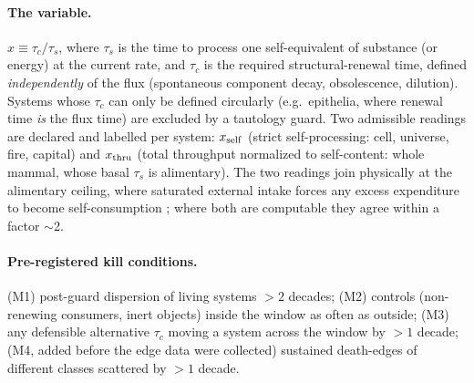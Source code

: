 \documentclass[11pt]{article}
\begin{document}
\paragraph{The variable.} $x \equiv \tau_c/\tau_s$, where $\tau_s$ is the time to process one
self-equivalent of substance (or energy) at the current rate, and $\tau_c$ is the required
structural-renewal time, defined \emph{independently} of the flux (spontaneous component decay,
obsolescence, dilution). Systems whose $\tau_c$ can only be defined circularly (e.g.\ epithelia,
where renewal time \emph{is} the flux time) are excluded by a tautology guard. Two admissible
readings are declared and labelled per system: $x_{\rm self}$ (strict self-processing: cell,
universe, fire, capital) and $x_{\rm thru}$ (total throughput normalized to self-content: whole
mammal, whose basal $\tau_s$ is alimentary). The two readings join physically at the alimentary
ceiling, where saturated external intake forces any excess expenditure to become
self-consumption \cite{Thurber2019}; where both are computable they agree within a factor $\sim$2.

\paragraph{Pre-registered kill conditions.} (M1) post-guard dispersion of living systems
$>2$ decades; (M2) controls (non-renewing consumers, inert objects) inside the window as often
as outside; (M3) any defensible alternative $\tau_c$ moving a system across the window by
$>1$ decade; (M4, added before the edge data were collected) sustained death-edges of different
classes scattered by $>1$ decade.
\end{document}
